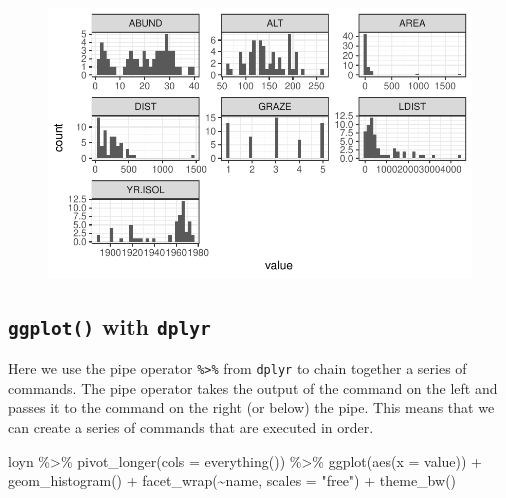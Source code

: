 \documentclass[
  10pt,
  letterpaper,
  DIV=11,
  numbers=noendperiod]{scrartcl}
\newenvironment{Shaded}{\begin{snugshade}}{\end{snugshade}}
\newcommand{\AttributeTok}[1]{\textcolor[rgb]{0.40,0.45,0.13}{#1}}
\newcommand{\FunctionTok}[1]{\textcolor[rgb]{0.28,0.35,0.67}{#1}}
\newcommand{\NormalTok}[1]{\textcolor[rgb]{0.00,0.23,0.31}{#1}}
\newcommand{\SpecialCharTok}[1]{\textcolor[rgb]{0.37,0.37,0.37}{#1}}
\newcommand{\StringTok}[1]{\textcolor[rgb]{0.13,0.47,0.30}{#1}}
\begin{document}
\begin{figure}[H]

{\centering \includegraphics{ENVX2001-2024-Lab07_files/figure-pdf/unnamed-chunk-4-1.pdf}

}

\end{figure}

\subsection{\texorpdfstring{\texttt{ggplot()} with
\texttt{dplyr}}{ggplot() with dplyr}}

Here we use the pipe operator \texttt{\%\textgreater{}\%} from
\texttt{dplyr} to chain together a series of commands. The pipe operator
takes the output of the command on the left and passes it to the command
on the right (or below) the pipe. This means that we can create a series
of commands that are executed in order.

\begin{Shaded}
\begin{Highlighting}[]
\NormalTok{loyn }\SpecialCharTok{\%\textgreater{}\%} 
  \FunctionTok{pivot\_longer}\NormalTok{(}\AttributeTok{cols =} \FunctionTok{everything}\NormalTok{()) }\SpecialCharTok{\%\textgreater{}\%} 
  \FunctionTok{ggplot}\NormalTok{(}\FunctionTok{aes}\NormalTok{(}\AttributeTok{x =}\NormalTok{ value)) }\SpecialCharTok{+} 
  \FunctionTok{geom\_histogram}\NormalTok{() }\SpecialCharTok{+} 
  \FunctionTok{facet\_wrap}\NormalTok{(}\SpecialCharTok{\textasciitilde{}}\NormalTok{name, }\AttributeTok{scales =} \StringTok{"free"}\NormalTok{) }\SpecialCharTok{+}
  \FunctionTok{theme\_bw}\NormalTok{()}
\end{Highlighting}
\end{Shaded}
\end{document}
